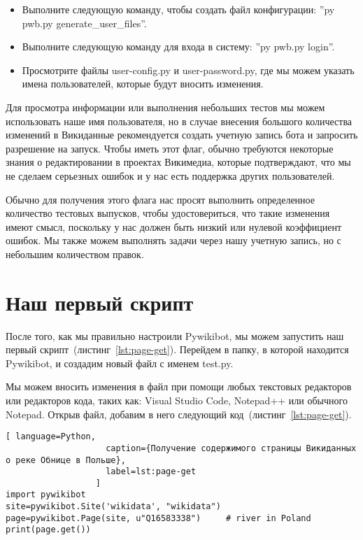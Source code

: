\begin{itemize}
  \setlength{\itemindent}{2em}
  \item Выполните следующую команду, чтобы создать файл конфигурации: ''py pwb.py generate\_user\_files''.
  \item Выполните следующую команду для входа в систему: ''py pwb.py login''.
  \item Просмотрите файлы user-config.py и user-password.py, где мы можем указать имена пользователей, которые будут вносить изменения.
\end{itemize}

Для просмотра информации или выполнения небольших тестов мы можем использовать наше имя пользователя, но в случае внесения большого количества изменений в Викиданные рекомендуется создать учетную запись бота и запросить разрешение на запуск. Чтобы иметь этот флаг, обычно требуются некоторые знания о редактировании в проектах Викимедиа, которые подтверждают, что мы не сделаем серьезных ошибок и у нас есть поддержка других пользователей.

Обычно для получения этого флага нас просят выполнить определенное количество тестовых выпусков, чтобы удостовериться, что такие изменения имеют смысл, поскольку у нас должен быть низкий или нулевой коэффициент ошибок. Мы также можем выполнять задачи через нашу учетную запись, но с небольшим количеством правок.

\section{Наш первый скрипт}
\label{sec:firstScript}
После того, как мы правильно настроили Pywikibot, мы можем запустить 
наш первый скрипт~(листинг~\ref{lst:page-get}). 
Перейдем в папку, в которой находится Pywikibot, и создадим новый файл с именем test.py.

Мы можем вносить изменения в файл при помощи любых текстовых редакторов 
или редакторов кода, таких как: 
Visual Studio Code, Notepad++ или обычного Notepad. 
Открыв файл, добавим в него следующий код~(листинг~\ref{lst:page-get}).

%
\begin{lstlisting}[ language=Python,
                    caption={Получение содержимого страницы Викиданных о реке Обнице в Польше},
                    label=lst:page-get
                  ]
import pywikibot
site=pywikibot.Site('wikidata', "wikidata")
page=pywikibot.Page(site, u"Q16583338")     # river in Poland
print(page.get())
\end{lstlisting}

